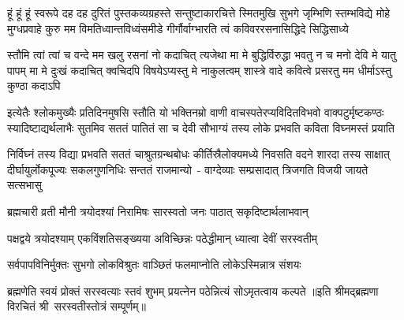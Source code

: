 \fourlineindentedshloka
{हूं हूं हूं स्वरूपे दह दह दुरितं पुस्तकव्यग्रहस्ते}
{सन्तुष्टाकारचित्ते स्मितमुखि सुभगे जृम्भिणि स्तम्भविद्ये}
{मोहे मुग्धप्रवाहे कुरु मम विमतिध्वान्तविध्वंसमीडे}
{गीर्गौर्वाग्भारति त्वं कविवररसनासिद्धिदे सिद्धिसाध्ये}

\fourlineindentedshloka
{स्तौमि त्वां त्वां च वन्दे मम खलु रसनां नो कदाचित् त्यजेथा}
{मा मे बुद्धिर्विरुद्धा भवतु न च मनो देवि मे यातु पापम्}
{मा मे दुःखं कदाचित् क्वचिदपि विषयेऽप्यस्तु मे नाकुलत्वम्}
{शास्त्रे वादे कवित्वे प्रसरतु मम धीर्माऽस्तु कुण्ठा कदाऽपि}

\fourlineindentedshloka
{इत्येतैः श्लोकमुख्यैः प्रतिदिनमुषसि स्तौति यो भक्तिनम्रो}
{वाणी वाचस्पतेरप्यविदितविभवो वाक्पटुर्मृष्टकण्ठः}
{स्यादिष्टाद्यर्थलाभैः सुतमिव सततं पातितं सा च देवी}
{सौभाग्यं तस्य लोके प्रभवति कविता विघ्नमस्तं प्रयाति}

\fourlineindentedshloka
{निर्विघ्नं तस्य विद्या प्रभवति सततं चाश्रुतग्रन्थबोधः}
{कीर्तिस्रैलोक्यमध्ये निवसति वदने शारदा तस्य साक्षात्}
{दीर्घायुर्लोकपूज्यः सकलगुणनिधिः सन्ततं राजमान्यो~-}
{वाग्देव्याः सम्प्रसादात् त्रिजगति विजयी जायते सत्सभासु}

\twolineshloka
{ब्रह्मचारी व्रती मौनी त्रयोदश्यां निरामिषः}
{सारस्वतो जनः पाठात् सकृदिष्टार्थलाभवान्}

\twolineshloka
{पक्षद्वये त्रयोदश्याम् एकविंशतिसङ्ख्यया}
{अविच्छिन्नः पठेद्धीमान् ध्यात्वा देवीं सरस्वतीम्}

\twolineshloka
{सर्वपापविनिर्मुक्तः सुभगो लोकविश्रुतः}
{वाञ्छितं फलमाप्नोति लोकेऽस्मिन्नात्र संशयः}

\twolineshloka
{ब्रह्मणेति स्वयं प्रोक्तं सरस्वत्याः स्तवं शुभम्}
{प्रयत्नेन पठेन्नित्यं सोऽमृतत्वाय कल्पते}
॥इति श्रीमद्ब्रह्मणा विरचितं श्री~सरस्वतीस्तोत्रं सम्पूर्णम्॥
\setlength{\shlokaspaceskip}{24pt}